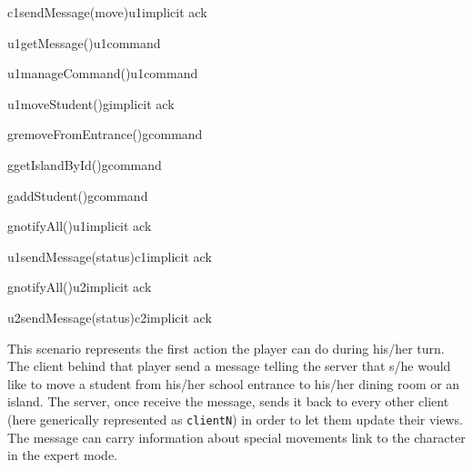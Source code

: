 \documentclass[a4paper]{article}
\begin{document}
	\begin{center}
		\begin{sequencediagram}

			\begin{call}{c1}{sendMessage(move)}{u1}{implicit ack}
				\begin{call}{u1}{getMessage()}{u1}{command}
				\end{call}
				\begin{call}{u1}{manageCommand()}{u1}{command}
				\end{call}
				\begin{call}{u1}{moveStudent()}{g}{implicit ack}
					\begin{call}{g}{removeFromEntrance()}{g}{command}
					\end{call}
					\begin{call}{g}{getIslandById()}{g}{command}
					\end{call}
					\begin{call}{g}{addStudent()}{g}{command}
					\end{call}
					\begin{call}{g}{notifyAll()}{u1}{implicit ack}
						\begin{call}{u1}{sendMessage(status)}{c1}{implicit ack}
						\end{call}
					\end{call}
					\begin{call}{g}{notifyAll()}{u2}{implicit ack}
						\begin{call}{u2}{sendMessage(status)}{c2}{implicit ack}
						\end{call}
					\end{call}
				\end{call}
			\end{call}
		\end{sequencediagram}
	\end{center}

	This scenario represents the first action the player can do during his/her turn. The client behind that player send a message telling the server that s/he would like to move a student from his/her school entrance to his/her dining room or an island. The server, once receive the message, sends it back to every other client (here generically represented as \verb|clientN|) in order to let them update their views. The message can carry information about special movements link to the character in the expert mode.
\end{document}
